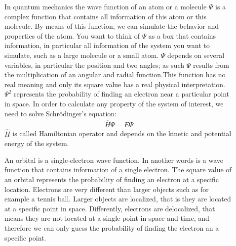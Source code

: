 \documentclass[main.tex]{subfiles}
\begin{document}
\begin{description}
\item[] 
In quantum mechanics the wave function of an atom or a molecule $\Psi$ is a complex function that contains all information of this atom or this molecule. By means of this function, we can simulate the behavior and properties of the atom. You want to think of $\Psi$ as a box that contains information, in particular all information of the system you want to simulate, such as a large molecule or a small atom. $\Psi$ depends on several variables, in particular the position and two angles; as such $\Psi$ results from the multiplication of an angular and radial function.This function has no real meaning and only its square value has a real physical interpretation. $\Psi^2$ represents the probability of finding an electron near a particular point in space. In order to calculate any property of the system of interest, we need to solve Schr\"{o}dinger's equation:
\begin{equation*}\begin{split}
\hat{H}\Psi=E\Psi
\end{split}\end{equation*}
$\hat{H}$ is called Hamiltonian operator and depends on the kinetic and potential energy of the system.
\item[] 
An orbital is a single-electron wave function. In another words is a wave function that contains information of a single electron. The square value of an orbital represents the probability of finding an electron at a specific location. Electrons are very different than larger objects such as for example a tennis ball. Larger objects are localized, that is they are located at a specific point in space. Differently, electrons are delocalized, that means they are not located at a single point in space and time, and therefore we can only guess the probability of finding the electron an a specific point.
\item[] 

\end{description}
\end{document}
